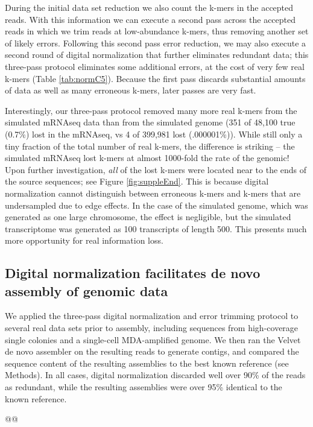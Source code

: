\documentclass[10pt]{article}
\begin{document}
During the initial data set reduction we also count the k-mers in the
accepted reads.  With this information we can execute a second pass
across the accepted reads in which we trim reads at low-abundance
k-mers, thus removing another set of likely errors.  Following this
second pass error reduction, we may also execute a second round of
digital normalization that further eliminates redundant data; this
three-pass protocol eliminates some additional errors, at the cost
of very few real k-mers (Table \ref{tab:normC5}).  Because the first
pass discards substantial amounts of data as well as many erroneous
k-mers, later passes are very fast.

Interestingly, our three-pass protocol removed many more real k-mers
from the simulated mRNAseq data than from the simulated genome (351 of
48,100 true (0.7\%) lost in the mRNAseq, vs 4 of 399,981 lost
(.000001\%)).  While still only a tiny fraction of the total number of
real k-mers, the difference is striking -- the simulated mRNAseq lost
k-mers at almost 1000-fold the rate of the genomic!  Upon further
investigation, {\em all} of the lost k-mers were located near to the
ends of the source sequences; see Figure \ref{fig:suppleEnd}.  This is
because digital normalization cannot distinguish between erroneous
k-mers and k-mers that are undersampled due to edge effects.  In the
case of the simulated genome, which was generated as one large
chromosome, the effect is negligible, but the simulated transcriptome
was generated as 100 transcripts of length 500.  This presents much
more opportunity for real information loss.

\subsection*{Digital normalization facilitates de novo assembly of genomic data}

We applied the three-pass digital normalization and error trimming
protocol to several real data sets prior to assembly, including
sequences from high-coverage single colonies and a single-cell
MDA-amplified genome.  We then ran the Velvet de novo assembler on the
resulting reads to generate contigs, and compared the sequence content
of the resulting assemblies to the best known reference (see Methods).
In all cases, digital normalization discarded well over 90\% of the
reads as redundant, while the resulting assemblies were over 95\%
identical to the known reference.

@@
\end{document}
